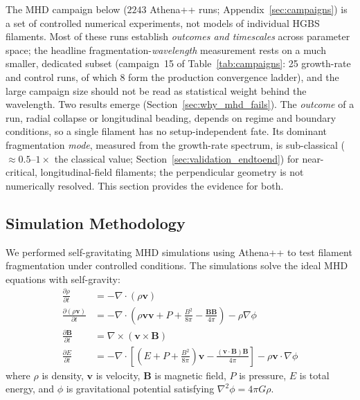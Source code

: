 \documentclass[usenatbib,twoside,twocolumn]{mnras}
\begin{document}
The MHD campaign below ($2243$ Athena++ runs; Appendix~\ref{sec:campaigns}) is a set of controlled numerical experiments, not models of individual HGBS filaments. Most of these runs establish \emph{outcomes and timescales} across parameter space; the headline fragmentation-\emph{wavelength} measurement rests on a much smaller, dedicated subset (campaign~15 of Table~\ref{tab:campaigns}: 25 growth-rate and control runs, of which 8 form the production convergence ladder), and the large campaign size should not be read as statistical weight behind the wavelength. Two results emerge (Section~\ref{sec:why_mhd_fails}). The \emph{outcome} of a run, radial collapse or longitudinal beading, depends on regime and boundary conditions, so a single filament has no setup-independent fate. Its dominant fragmentation \emph{mode}, measured from the growth-rate spectrum, is sub-classical ($\approx0.5$--$1\times$ the classical value; Section~\ref{sec:validation_endtoend}) for near-critical, longitudinal-field filaments; the perpendicular geometry is not numerically resolved. This section provides the evidence for both.

\subsection{Simulation Methodology}

We performed self-gravitating MHD simulations using Athena++ \citep{Stone2020} to test filament fragmentation under controlled conditions. The simulations solve the ideal MHD equations with self-gravity:
\begin{align}
\frac{\partial \rho}{\partial t} &= -\nabla \cdot (\rho \mathbf{v}) \\
\frac{\partial (\rho \mathbf{v})}{\partial t} &= -\nabla \cdot \left(\rho \mathbf{v} \mathbf{v} + P + \frac{B^2}{8\pi} - \frac{\mathbf{B}\mathbf{B}}{4\pi}\right) - \rho \nabla \phi \\
\frac{\partial \mathbf{B}}{\partial t} &= \nabla \times (\mathbf{v} \times \mathbf{B}) \\
\frac{\partial E}{\partial t} &= -\nabla \cdot \left[(E + P + \frac{B^2}{8\pi})\mathbf{v} - \frac{(\mathbf{v} \cdot \mathbf{B})\mathbf{B}}{4\pi}\right] - \rho \mathbf{v} \cdot \nabla \phi
\end{align}
where $\rho$ is density, $\mathbf{v}$ is velocity, $\mathbf{B}$ is magnetic field, $P$ is pressure, $E$ is total energy, and $\phi$ is gravitational potential satisfying $\nabla^2 \phi = 4\pi G\rho$.
\end{document}
